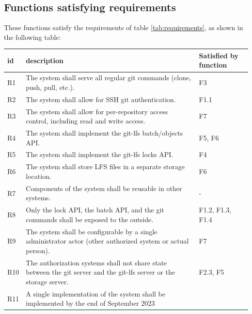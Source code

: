 \subsection{Functions satisfying requirements}

These functions satisfy the requirements of table \ref{tab:requirements}, as shown in the following table:

\begin{longtable}{|p{}|p{}|p{}|}
    \hline
    id  & description                                                                                                          & Satisfied by function \\ \hline
    \endfirsthead
    \endhead
    R1  & The system shall serve all regular git commands (clone, push, pull, etc.).                                           & F3                    \\ \hline
    R2  & The system shall allow for SSH git authentication.                                                                   & F1.1                  \\ \hline
    R3  & The system shall allow for per-repository access control, including read and write access.                           & F7                    \\ \hline
    R4  & The system shall implement the git-lfs batch/objects API.                                                            & F5, F6                \\ \hline
    R5  & The system shall implement the git-lfs locks API.                                                                    & F4                    \\ \hline
    R6  & The system shall store LFS files in a separate storage location.                                                     & F6                    \\ \hline
    R7  & Components of the system shall be reusable in other systems.                                                         & -                     \\ \hline
    R8  & Only the lock API, the batch API, and the git commands shall be exposed to the outside.                              & F1.2, F1.3, F1.4      \\ \hline
    R9  & The system shall be configurable by a single administrator actor (other authorized system or actual person).         & F7                    \\ \hline
    R10 & The authorization systems shall not share state between the git server and the git-lfs server or the storage server. & F2.3, F5              \\ \hline
    R11 & A single implementation of the system shall be implemented by the end of September 2023                              &                       \\ \hline
\end{longtable}

